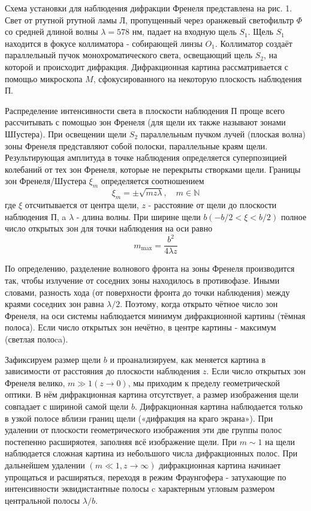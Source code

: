 \documentclass[a4paper, 12pt]{article}
\begin{document}
Схема установки для наблюдения дифракции Френеля представлена на рис. 1. Свет от ртутной ртутной ламы Л, пропущенный через оранжевый светофильтр $\Phi$ со средней длиной волны $\lambda=578$ нм, падает на входную щель $S_1$. Щель $S_1$ находится в фокусе коллиматора - собирающей линзы $O_1$. Коллиматор создаёт параллельный пучок монохроматического света, освещающий щель $S_2$, на которой и происходит дифракция. Дифракционная картина рассматривается с помощьо микроскопа $M$, сфокусированного на некоторую плоскость наблюдения П.

Распределение интенсивности света в плоскости наблюдения П проще всего рассчитывать с помощыо зон Френеля (для щели их также называют зонами ШIустера). При освещении щели $S_2$ параллельным пучком лучей (плоская волна) зоны Френеля представляют собой полоски, параллельные краям щели. Результирующая амплитуда в точке наблюдения определяется суперпозицией колебаний от тех зон Френеля, которые не перекрыты створками щели. Границы зон Френеля/Шустера $\xi_m$ определяется соотношением
$$
\xi_m= \pm \sqrt{m z \lambda}, \quad m \in \mathbb{N}
$$
где $\xi$ отсчитывается от центра щели, $z$ - расстояние от щели до плоскости наблюдения П, a $\lambda$ - длина волны. При ширине щели $b(-b / 2<\xi<b / 2)$ полное число открытых зон для точки наблюдения на оси равно
$$
m_{\max }=\frac{b^2}{4 \lambda z}
$$

По определению, разделение волнового фронта на зоны Френеля производится так, чтобы излучение от соседних зоны находилось в противофазе. Иными словами, разность хода (от поверхности фронта до точки наблюдения) между краями соседних зон равна $\lambda / 2$. Поэтому, когда открыто чётное число зон Френеля, на оси системы наблюдается минимум дифракционной картины (тёмная полоса). Если число открытых зон нечётно, в центре картины - максимум (светлая полоca).

Зафиксируем размер щели $b$ и проанализируем, как меняется картина в зависимости от расстояния до плоскости наблюдения $z$. Если число открытых зон Френеля велико, $m \gg 1(z \rightarrow 0)$, мы приходим к пределу геометрической оптики. В нём дифракционная картина отсутствует, а размер изображения щели совпадает с шириной самой щели $b$. Дифракционная картина наблюдается только в узкой полосе вблизи границ щели («дифракция на краго экрана»). При удалении от плоскости геометрического изображения эти две группы полос постепенно расширяотея, заполняя всё изображение щели. При $m \sim 1$ на щели наблюдается сложная картина из небольшого числа дифракционных полос. При дальнейшем удалении $(m \ll 1, z \rightarrow \infty)$ дифракционная картина начинает упрощаться и расширяться, переходя в режим Фраунгофера - затухающие по интенсивности эквидистантные полосы c характерным угловым размером центральной полосы $\lambda / b$.
\end{document}
